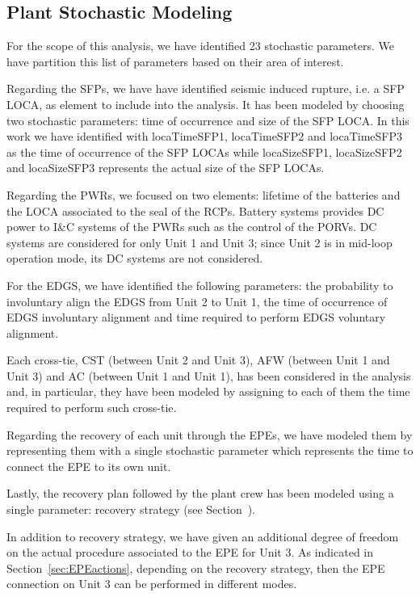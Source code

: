 \subsection{Plant Stochastic Modeling}
For the scope of this analysis, we have identified 23 stochastic parameters. We have 
partition this list of parameters based on their area of interest.

Regarding the SFPs, we have have identified seismic induced rupture, i.e. a SFP LOCA, as 
element to include into the analysis. It has been modeled by choosing two stochastic 
parameters: time of  occurrence and size of the SFP LOCA. In this work we have identified 
with locaTimeSFP1, locaTimeSFP2 and locaTimeSFP3 as the time of occurrence of the SFP 
LOCAs while locaSizeSFP1, locaSizeSFP2 and locaSizeSFP3 represents the actual size of 
the SFP LOCAs.

Regarding the PWRs, we focused on two elements: lifetime of the batteries and the LOCA 
associated to the seal of the RCPs. Battery systems provides DC power to I\&C systems 
of the PWRs such as the control of the PORVs. DC systems are considered for only 
Unit 1 and Unit 3; since Unit 2 is in mid-loop operation mode, its DC systems are not 
considered.

For the EDGS, we have identified the following parameters: the probability to 
involuntary align the EDGS from Unit 2 to Unit 1, the time of occurrence of EDGS
involuntary alignment and time required to perform EDGS voluntary alignment.  

Each cross-tie, CST (between Unit 2 and Unit 3), AFW (between Unit 1 and Unit 3) 
and AC (between Unit 1 and Unit 1), has been considered in the analysis and, in 
particular, they have been modeled by assigning to each of them the time required 
to perform such cross-tie.

Regarding the recovery of each unit through the EPEs, we have modeled them by 
representing them with a single stochastic parameter which represents the
time to connect the EPE to its own unit.

Lastly, the recovery plan followed by the plant crew has been modeled using a single
parameter: recovery strategy (see Section~\cite{sec:accidentProgression}).

In addition to recovery strategy, we have given an additional degree of freedom on 
the actual procedure associated to the EPE for Unit 3. 
As indicated in Section~\ref{sec:EPEactions}, depending on the  recovery strategy, 
then the EPE connection on Unit 3 can be performed in different modes. 

